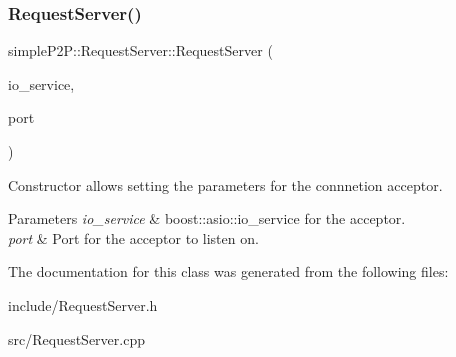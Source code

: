 \subsubsection{\texorpdfstring{Request\+Server()}{RequestServer()}}
{\footnotesize\ttfamily simple\+P2\+P\+::\+Request\+Server\+::\+Request\+Server (\begin{DoxyParamCaption}\item[{boost\+::asio\+::io\+\_\+service \&}]{io\+\_\+service,  }\item[{Uint16}]{port }\end{DoxyParamCaption})}



Constructor allows setting the parameters for the connnetion acceptor. 


\begin{DoxyParams}{Parameters}
{\em io\+\_\+service} & boost\+::asio\+::io\+\_\+service for the acceptor. \\
\hline
{\em port} & Port for the acceptor to listen on. \\
\hline
\end{DoxyParams}


The documentation for this class was generated from the following files\+:\begin{DoxyCompactItemize}
\item 
include/Request\+Server.\+h\item 
src/Request\+Server.\+cpp\end{DoxyCompactItemize}
